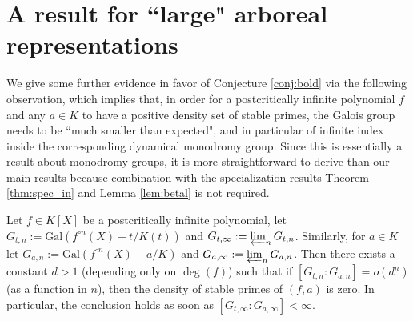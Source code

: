 \documentclass[a4paper]{amsart}
\begin{document}
 \section{A result for ``large" arboreal representations}
   \label{sec:large}   
 We give some further evidence in favor of Conjecture \ref{conj:bold} via the following observation, which implies that, in order for a postcritically infinite polynomial $f$ and any $a\in K$ to have a positive density set of stable primes, the Galois group needs to be ``much smaller than expected", and in particular of infinite index inside the corresponding dynamical monodromy group. Since this is essentially a result about monodromy groups, it is more straightforward to derive than our main results because combination with the specialization results Theorem \ref{thm:spec_in} and Lemma \ref{lem:betal} is not required.
  \begin{lemma}
  \label{lem:cond}
  Let $f\in K[X]$ be a postcritically infinite polynomial, let 
  $G_{t,n}:=\mathrm{Gal}(f^{\circ n}(X)-t/K(t))$ and $G_{t,\infty}:=\varprojlim_n G_{t,n}$. Similarly, for $a\in K$ let $G_{a,n}:=\mathrm{Gal}(f^{\circ n}(X)-a/K)$ and $G_{a,\infty}:=\varprojlim_n G_{a,n}$. Then there exists a constant $d>1$ (depending only on $\deg(f)$) such that if
  $[G_{t,n}: G_{a,n}] = o(d^n)$ (as a function in $n$),  
  then the density of stable primes of $(f,a)$ is zero. In particular, the conclusion holds as soon as $[G_{t,\infty}:G_{a,\infty}]<\infty$.
  \end{lemma}
\end{document}
